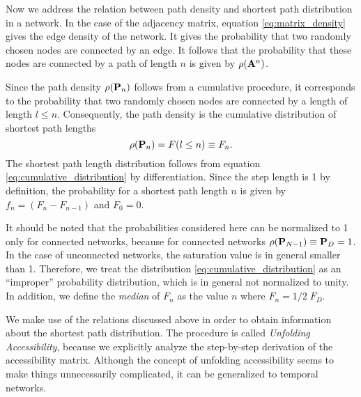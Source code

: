 Now we address the relation between path density and shortest path distribution in a network.
In the case of the adjacency matrix, equation \eqref{eq:matrix_density} gives the edge density of the network.
It gives the probability that two randomly chosen nodes are connected by an edge.
It follows that the probability that these nodes are connected by a path of length $n$ is given by $\rho (\mathbf{A}^n)$.

Since the path density $\rho (\mathbf{P}_n)$ follows from a cumulative procedure, it corresponds to the probability that two randomly chosen nodes are connected by a length of length $l\leq n$.
Consequently, the path density is the cumulative distribution of shortest path lengths
\begin{equation}\label{eq:cumulative_distribution}
\rho (\mathbf{P}_n)=F(l\leq n)\equiv F_n .
\end{equation}
The shortest path length distribution follows from equation \eqref{eq:cumulative_distribution} by differentiation.
Since the step length is 1 by definition, the probability for a shortest path length $n$ is given by $f_n=(F_n-F_{n-1})$ and $F_0=0$.

It should be noted that the probabilities considered here can be normalized to 1 only for connected networks, because for connected networks $\rho (\mathbf{P}_{N-1})\equiv \mathbf{P}_D=1$.
In the case of unconnected networks, the saturation value is in general smaller than 1.
Therefore,  we treat the distribution \eqref{eq:cumulative_distribution} as an ``improper'' probability distribution, which is in general not normalized to unity.
In addition, we define the \emph{median} of $F_n$ as the value $n$ where $F_n=1/2 \; F_D$.

We make use of the relations discussed above in order to obtain information about the shortest path distribution.
The procedure is called \emph{Unfolding Accessibility}, because we explicitly analyze the step-by-step derivation of the accessibility matrix.
Although the concept of unfolding accessibility seems to make things unnecessarily complicated, it can be generalized to temporal networks.

